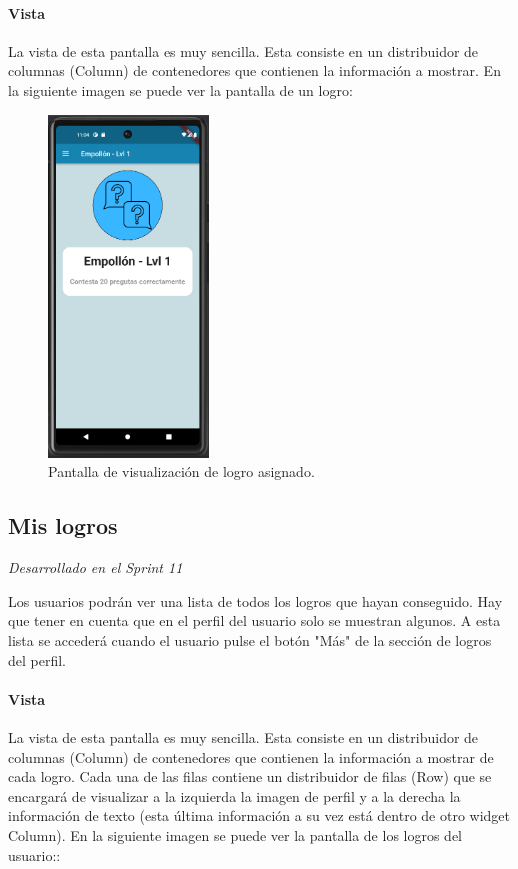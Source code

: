 \paragraph*{Vista}
La vista de esta pantalla es muy sencilla. Esta consiste en un distribuidor de columnas (Column) de contenedores que contienen la información a mostrar. En la siguiente imagen se puede ver la pantalla de un logro: 

\begin{figure}[H]
  \centering
  \includegraphics[width=0.38\textwidth]{imagenes/c7/verlogro.png}
  \caption{Pantalla de visualización de logro asignado.} 
  \label{fig:ver_logro}
\end{figure}


\subsection{Mis logros} 

\textit{Desarrollado en el Sprint 11}

Los usuarios podrán ver una lista de todos los logros que hayan conseguido. Hay que tener en cuenta que en el perfil del usuario solo se muestran algunos. A esta lista se accederá cuando el usuario
pulse el botón "Más" de la sección de logros del perfil.
\paragraph*{Vista}
La vista de esta pantalla es muy sencilla. Esta consiste en un distribuidor de columnas (Column) de contenedores que contienen la información a mostrar de cada logro. Cada una de las filas contiene un distribuidor de filas (Row) que se encargará
de visualizar a la izquierda la imagen de perfil y a la derecha la información de texto (esta última información a su vez está dentro de otro widget Column). En la siguiente imagen se puede ver la pantalla de los logros del usuario:: 

